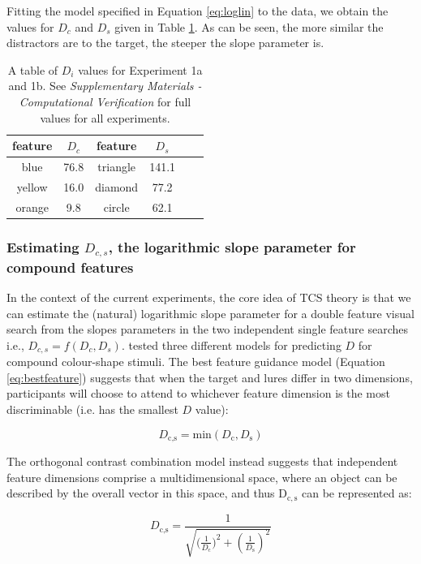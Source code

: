 \documentclass[preprint,12pt,authoryear]{elsarticle}
\begin{document}
Fitting the model specified in Equation \ref{eq:loglin} to the data, we obtain the values for $D_c$ and $D_s$ given in Table \ref{tab:reimp_Dc_Ds}. As can be seen, the more similar the distractors are to the target, the steeper the slope parameter is. 

\begin{table}[h]
\centering
\begin{tabular}{ c|c||c|ccc } 
feature & $D_c$ & feature & $D_s$\\
 \hline 
blue & 76.8 & triangle & 141.1\\
yellow & 16.0 & diamond & 77.2\\
orange & 9.8  & circle & 62.1\\
\end{tabular}
\caption{A table of $D_i$ values for Experiment 1a and 1b. See \textit{Supplementary Materials - Computational Verification} for full values for all experiments.}
\label{tab:reimp_Dc_Ds}
\end{table}

\subsubsection{Estimating $D_{c,s}$, the logarithmic slope parameter for compound features}

In the context of the current experiments, the core idea of TCS theory is that we can estimate the (natural) logarithmic slope parameter for a double feature visual search from the slopes parameters in the two independent single feature searches i.e., $D_{c,s} = f(D_c, D_s)$. \cite{buetti2019predicting} tested three different models for predicting $D$ for compound colour-shape stimuli. The best feature guidance model (Equation \ref{eq:bestfeature}) suggests that when the target and lures differ in two dimensions, participants will choose to attend to whichever feature dimension is the most discriminable (i.e. has the smallest $D$ value):

\begin{equation}
D_\text{c,s} = \text{min}\left(D_\text{c}, D_\text{s}\right)
\label{eq:bestfeature}
\end{equation}

The orthogonal contrast combination model instead suggests that independent feature dimensions comprise a multidimensional space, where an object can be described by the overall vector in this space, and thus $\mathrm{D_{c,s}}$ can be represented as:

\begin{equation}
D_\text{c,s} = \frac{1}{\sqrt{{(\frac{1}{D_\text{c}}})^2 + (\frac{1}{D_\text{s}})^2}}
\label{eq:orthogonalcontrast}
\end{equation}
\end{document}
